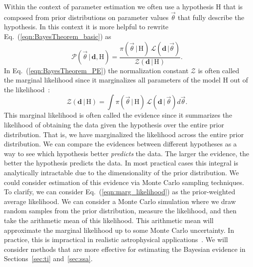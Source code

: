 Within the context of parameter estimation we often use a hypothesis H that is composed from prior distributions on parameter values $\vec{\theta}$ that fully describe the hypothesis. In this context it is more helpful to rewrite Eq.~(\ref{eqn:BayesTheorem_basic}) as
\begin{equation}\label{eqn:BayesTheorem_PE}
   \mathcal{P}(\vec{\theta} \, | \, \mathbf{d}, \mathrm{H}) = \frac{\pi(\vec{\theta} \, | \, \mathrm{H}) \, \mathcal{L}(\mathbf{d} \, | \vec{\theta})}{\mathcal{Z}(\mathbf{d} \, | \, \mathrm{H})}.
\end{equation} 
In Eq.~(\ref{eqn:BayesTheorem_PE}) the normalization constant $\mathcal{Z}$ is often called the marginal likelihood since it marginalizes all parameters of the model H out of the likelihood~\cite{hobson2010bayesian}:
\begin{equation}\label{eqn:marg_likelihood}
    \mathcal{Z}(\mathbf{d} \, | \, \mathrm{H}) = \int \pi(\vec{\theta} \, | \, \mathrm{H}) \, \mathcal{L}(\mathbf{d} \, | \, \vec{\theta}) d\vec{\theta}.
\end{equation} 
This marginal likelihood is often called the evidence since it summarizes the likelihood of obtaining the data given the hypothesis over the entire prior distribution. That is, we have marginalized the likelihood across the entire prior distribution. We can compare the evidences between different hypotheses as a way to see which hypothesis better \textit{predicts} the data. The larger the evidence, the better the hypothesis predicts the data. In most practical cases this integral is analytically intractable due to the dimensionality of the prior distribution. We could consider estimation of this evidence via Monte Carlo sampling techniques. To clarify, we can consider Eq.~(\ref{eqn:marg_likelihood}) as the prior-weighted average likelihood.
We can consider a Monte Carlo simulation where we draw random samples from the prior distribution, measure the likelihood, and then take the arithmetic mean of this likelihood. This arithmetic mean will approximate the marginal likelihood up to some Monte Carlo uncertainty. In practice, this is impractical in realistic astrophysical applications~\cite{wall2012practical}. We will consider methods that are more effective for estimating the Bayesian evidence in Sections~\ref{sec:ti} and~\ref{sec:ssa}.


